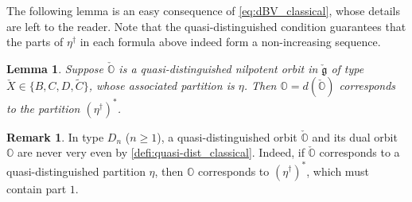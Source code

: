 \documentclass[11pt, a4paper]{amsart}
\newcommand{\g}{\mathfrak{g}}
\newcommand{\orb}{\mathbb{O}}
\newcommand{\fg}{\mathfrak{g}}
\newcommand{\ckfg}{{\check{\fg}}}
\newcommand{\ckorb}{\check{\orb}}
\newcommand{\cP}{\mathcal{P}}
\DeclareMathOperator{\codim}{codim}
\newcommand{\mC}{\widetilde{C}}
\newtheorem{Lem}[Thm]{Lemma}
\theoremstyle{definition}
\newtheorem{defi}[Thm]{Definition}
\newtheorem{Rem}[Thm]{Remark}
\numberwithin{equation}{section}
\begin{document}
The following lemma is an easy consequence of \eqref{eq:dBV_classical}, whose details are left to the reader. Note that the quasi-distinguished condition guarantees that the parts of $\eta^\dagger$ in each formula above indeed form a non-increasing sequence.

\begin{Lem}\label{lem:d_quasi-dis}
	Suppose $\ckorb$ is a quasi-distinguished nilpotent orbit in $\ckfg$ of type $\check{X} \in \{B, C, D, \mC\}$, whose associated partition is $\eta$. Then $\orb = d(\ckorb)$ corresponds to the partition $(\eta^\dagger)^*$.
\end{Lem}

\begin{Rem} \label{rem:dist_very_even}
	In type $D_n$ ($n \geqslant1$), a quasi-distinguished orbit $\ckorb$ and its dual orbit $\orb$ are never very even by \cref{defi:quasi-dist_classical}. Indeed, if $\ckorb$ corresponds to a quasi-distinguished partition $\eta$, then $\orb$ corresponds to $(\eta^\dagger)^*$, which must contain part $1$. 
\end{Rem}

\end{document}
